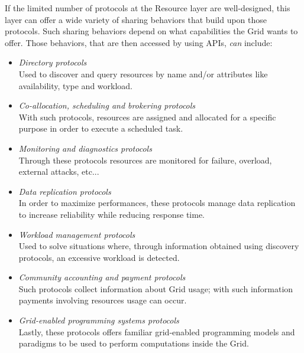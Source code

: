 If the limited number of protocols at the Resource layer are well-designed, this layer can offer a wide variety of sharing behaviors that build upon those protocols. Such sharing behaviors depend on what capabilities the Grid wants to offer. Those behaviors, that are then accessed by using APIs, \textit{can} include:
\begin{itemize}
    \item \textit{Directory protocols}\\
    Used to discover and query resources by name and/or attributes like availability, type and workload.
    \item \textit{Co-allocation, scheduling and brokering protocols}\\
    With such protocols, resources are assigned and allocated for a specific purpose in order to execute a scheduled task.
    \item \textit{Monitoring and diagnostics protocols}\\
    Through these protocols resources are monitored for failure, overload, external attacks, etc...
    \item \textit{Data replication protocols}\\
    In order to maximize performances, these protocols manage data replication to increase reliability while reducing response time.
    \item \textit{Workload management protocols}\\
    Used to solve situations where, through information obtained using discovery protocols, an excessive workload is detected.
    \item \textit{Community accounting and payment protocols}\\
    Such protocols collect information about Grid usage; with such information payments involving resources usage can occur.
    \item \textit{Grid-enabled programming systems protocols}\\
    Lastly, these protocols offers familiar grid-enabled programming models and paradigms to be used to perform computations inside the Grid. 
\end{itemize}

